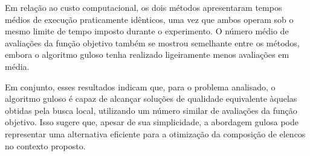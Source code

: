 Em relação ao custo computacional, os dois métodos apresentaram tempos médios de execução praticamente idênticos, uma vez que ambos operam sob o mesmo 
limite de tempo imposto durante o experimento. O número médio de avaliações da função objetivo também se mostrou semelhante entre os métodos, embora 
o algoritmo guloso tenha realizado ligeiramente menos avaliações em média.

Em conjunto, esses resultados indicam que, para o problema analisado, o algoritmo guloso é capaz de alcançar soluções de qualidade equivalente 
àquelas obtidas pela busca local, utilizando um número similar de avaliações da função objetivo. Isso sugere que, apesar de sua simplicidade, 
a abordagem gulosa pode representar uma alternativa eficiente para a otimização da composição de elencos no contexto proposto.